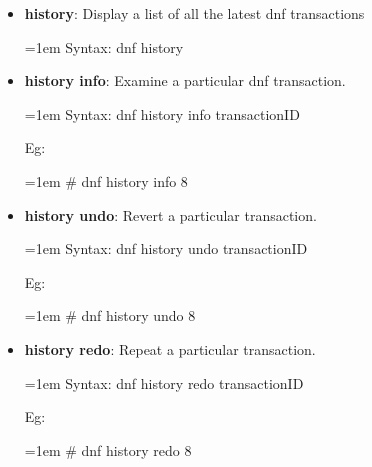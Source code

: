 \begin{flushleft}
\begin{itemize}
		\item \textbf{history}: Display a list of all the latest dnf transactions
		\begin{tcolorbox}[breakable,notitle,boxrule=-0pt,colback=pink,colframe=pink]
			\color{black}
			\font=1em
			Syntax: dnf history
			\font=4pt
		\end{tcolorbox}
		\bigskip
		\bigskip			

		\item \textbf{history info}: Examine a particular dnf transaction.
		\begin{tcolorbox}[breakable,notitle,boxrule=-0pt,colback=pink,colframe=pink]
			\color{black}
			\font=1em
			Syntax: dnf history info transactionID
			\font=4pt
		\end{tcolorbox}
		Eg:
		\begin{tcolorbox}[breakable,notitle,boxrule=-0pt,colback=black,colframe=black]
			\color{green}
			\font=1em
			\# dnf history info 8
			\font=4pt
		\end{tcolorbox}
		\bigskip
		\bigskip			

		\item \textbf{history undo}: Revert a particular transaction.
		\begin{tcolorbox}[breakable,notitle,boxrule=-0pt,colback=pink,colframe=pink]
			\color{black}
			\font=1em
			Syntax: dnf history undo transactionID
			\font=4pt
		\end{tcolorbox}
		Eg:
		\begin{tcolorbox}[breakable,notitle,boxrule=-0pt,colback=black,colframe=black]
			\color{green}
			\font=1em
			\# dnf history undo 8
			\font=4pt
		\end{tcolorbox}
		\bigskip
		\bigskip			

		\item \textbf{history redo}: Repeat a particular transaction.
		\begin{tcolorbox}[breakable,notitle,boxrule=-0pt,colback=pink,colframe=pink]
			\color{black}
			\font=1em
			Syntax: dnf history redo transactionID
			\font=4pt
		\end{tcolorbox}
		Eg:
		\begin{tcolorbox}[breakable,notitle,boxrule=-0pt,colback=black,colframe=black]
			\color{green}
			\font=1em
			\# dnf history redo 8
			\font=4pt
		\end{tcolorbox}
		\bigskip
		\bigskip		
		

\end{itemize}
\end{flushleft}
